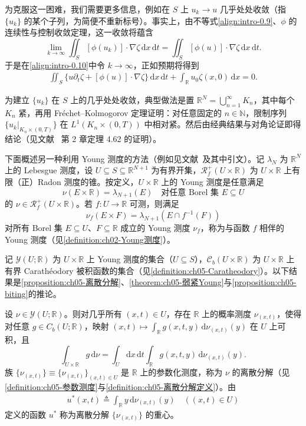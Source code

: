 \documentclass[../main.tex]{subfiles}
\begin{document}
为克服这一困难，我们需要更多信息，例如在 $S$ 上 $u_k\to u$ 几乎处处收敛（指 $\{u_k\}$ 的某个子列，为简便不重新标号）。事实上，由不等式\eqref{align:intro-0.9}、$\phi$ 的连续性与控制收敛定理，这一收敛将蕴含
\[
\lim_{k\to\infty}\iint_S[\phi(u_k)]\cdot\nabla\zeta\,\mathrm{d}x\,\mathrm{d}t
= \iint_S[\phi(u)]\cdot\nabla\zeta\,\mathrm{d}x\,\mathrm{d}t.
\]
于是在\eqref{align:intro-0.10}中令 $k\to\infty$，正如预期将得到
\begin{align}
\iint_S\{u\partial_t\zeta + [\phi(u)]\cdot\nabla\zeta\}\,\mathrm{d}x\,\mathrm{d}t
+ \int_{\mathbb{R}}u_0\zeta(x,0)\,\mathrm{d}x = 0. \label{align:intro-0.11}
\end{align}

为建立 $\{u_k\}$ 在 $S$ 上的几乎处处收敛，典型做法是置 $\mathbb{R}^N=\bigcup_{n=1}^\infty K_n$，其中每个 $K_n$ 紧，再用 Fréchet--Kolmogorov 定理证明：对任意固定的 $n\in\mathbb{N}$，限制序列 $\{u_k|_{K_n\times(0,T)}\}$ 在 $L^1(K_n\times(0,T))$ 中相对紧。然后由经典结果与对角论证即得结论（见文献~\cite{ref68} 第 2 章定理 4.62 的证明）。

下面概述另一种利用 Young 测度的方法（例如见文献~\cite{ref68}及其中引文）。记 $\lambda_N$ 为 $\mathbb{R}^N$ 上的 Lebesgue 测度，设 $U\subseteq S\subseteq\mathbb{R}^{N+1}$ 为有界开集，$\mathscr{R}^+_f(U\times\mathbb{R})$ 为 $U\times\mathbb{R}$ 上有限（正）Radon 测度的锥。按定义，$U\times\mathbb{R}$ 上的 Young 测度是任意满足
\[
\nu(E\times\mathbb{R}) = \lambda_{N+1}(E)
\quad \text{对任意 Borel 集 }E\subseteq U
\]
的 $\nu\in\mathscr{R}^+_f(U\times\mathbb{R})$。若 $f:U\to\mathbb{R}$ 可测，则满足
\[
\nu_f(E\times F) = \lambda_{N+1}(E\cap f^{-1}(F))
\]
对所有 Borel 集 $E\subseteq U$、$F\subseteq\mathbb{R}$ 成立的 Young 测度 $\nu_f$，称为与函数 $f$ 相伴的 Young 测度（见\cref{definition:ch02-Young测度}）。

记 $\mathcal{Y}(U;\mathbb{R})$ 为 $U\times\mathbb{R}$ 上 Young 测度的集合（$U\subseteq S$），$\mathcal{C}_b(U\times\mathbb{R})$ 为 $U\times\mathbb{R}$ 上有界 Carathéodory 被积函数的集合（见\cref{definition:ch05-Caratheodory}）。以下结果是\cref{proposition:ch05-离散分解}、\cref{theorem:ch05-弱紧Young}与\cref{proposition:ch05-biting}的推论。

\begin{proposition}\label{proposition:intro-0.2.1}
设 $\nu\in\mathcal{Y}(U;\mathbb{R})$。则对几乎所有 $(x,t)\in U$，存在 $\mathbb{R}$ 上的概率测度 $\nu_{(x,t)}$，使得对任意 $g\in C_b(U;\mathbb{R})$，映射 $(x,t)\mapsto\int_{\mathbb{R}}g(x,t,y)\,\mathrm{d}\nu_{(x,t)}(y)$ 在 $U$ 上可积，且
\[
\int_{U\times\mathbb{R}}g\,\mathrm{d}\nu
= \int_U \mathrm{d}x\,\mathrm{d}t\int_{\mathbb{R}}g(x,t,y)\,\mathrm{d}\nu_{(x,t)}(y).
\]
族 $\{\nu_{(x,t)}\}\equiv\{\nu_{(x,t)}\}_{(x,t)\in U}$ 是 $\mathbb{R}$ 上的参数化测度，称为 $\nu$ 的离散分解（见\cref{definition:ch05-参数测度}与\cref{definition:ch05-离散分解定义}）。由
\begin{align}
u^*(x,t) \triangleq  \int_{\mathbb{R}}y\,\mathrm{d}\nu_{(x,t)}(y) \quad ((x,t)\in U) \label{align:intro-0.12}
\end{align}
定义的函数 $u^*$ 称为离散分解 $\{\nu_{(x,t)}\}$ 的重心。
\end{proposition}
\end{document}
